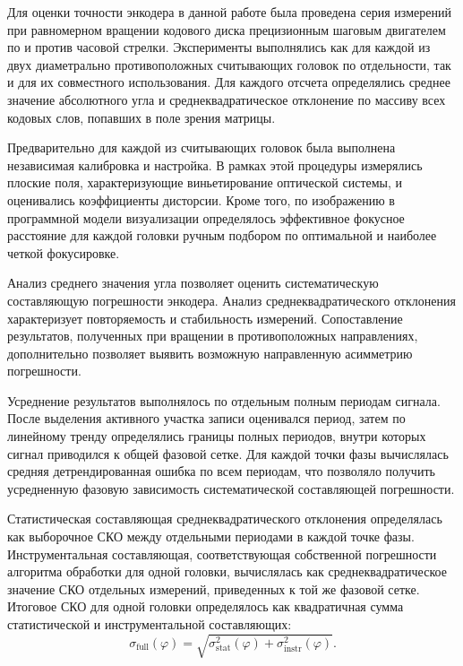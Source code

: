 Для оценки точности энкодера в данной работе была проведена серия измерений при равномерном вращении кодового диска прецизионным шаговым двигателем по и против часовой стрелки. Эксперименты выполнялись как для каждой из двух диаметрально противоположных считывающих головок по отдельности, так и для их совместного использования. Для каждого отсчета определялись среднее значение абсолютного угла и среднеквадратическое отклонение по массиву всех кодовых слов, попавших в поле зрения матрицы.

Предварительно для каждой из считывающих головок была выполнена независимая калибровка и настройка. В рамках этой процедуры измерялись плоские поля, характеризующие виньетирование оптической системы, и оценивались коэффициенты дисторсии. Кроме того, по изображению в программной модели визуализации определялось эффективное фокусное расстояние для каждой головки ручным подбором по оптимальной и наиболее четкой фокусировке.

Анализ среднего значения угла позволяет оценить систематическую составляющую погрешности энкодера. Анализ среднеквадратического отклонения характеризует повторяемость и стабильность измерений. Сопоставление результатов, полученных при вращении в противоположных направлениях, дополнительно позволяет выявить возможную направленную асимметрию погрешности.

Усреднение результатов выполнялось по отдельным полным периодам сигнала. После выделения активного участка записи оценивался период, затем по линейному тренду определялись границы полных периодов, внутри которых сигнал приводился к общей фазовой сетке. Для каждой точки фазы вычислялась средняя детрендированная ошибка по всем периодам, что позволяло получить усредненную фазовую зависимость систематической составляющей погрешности.

Статистическая составляющая среднеквадратического отклонения определялась как выборочное СКО между отдельными периодами в каждой точке фазы. Инструментальная составляющая, соответствующая собственной погрешности алгоритма обработки для одной головки, вычислялась как среднеквадратическое значение СКО отдельных измерений, приведенных к той же фазовой сетке. Итоговое СКО для одной головки определялось как квадратичная сумма статистической и инструментальной составляющих:
\begin{equation*}
\sigma_{\mathrm{full}}(\varphi)=\sqrt{\sigma_{\mathrm{stat}}^2(\varphi)+\sigma_{\mathrm{instr}}^2(\varphi)}.
\end{equation*}

